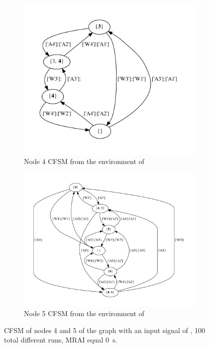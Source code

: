 \begin{figure}[h]
     \centering
     \begin{subfigure}[b]{0.49\textwidth}
         \centering
         \includegraphics[width=\textwidth]{images/fsm/fig_4_4.pdf}
		 \caption{Node \num{4} \ac{CFSM} from the environment of }
         \label{fig:fsm_node4}
     \end{subfigure}
     \hfill
     \begin{subfigure}[b]{0.49\textwidth}
         \centering
         \includegraphics[width=\textwidth]{images/fsm/fig_4_5.pdf}
		 \caption{Node \num{5} \ac{CFSM} from the environment of }
         \label{fig:fsm_node5}
     \end{subfigure}
		\caption{\ac{CFSM} of nodes \num{4} and \num{5} of the graph
			 with an input signal of ,
			\num{100} total different runs, \ac{MRAI} equal \SI{0}{\second}.}
        \label{fig:fsm_griffin_fig4}
\end{figure}

